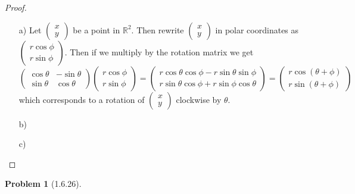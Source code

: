 \documentclass[10pt]{article}
\newcommand{\sk}{\vskip 10mm}
\newcommand{\bb}[1]{\mathbb{#1}}
\newcommand{\vc}[2]{\left(\begin{array}{cc} #1\\ #2\end{array}\right)}
\theoremstyle{plain}
\newtheorem{problem}{Problem}
\theoremstyle{remark}
\begin{document}
\begin{proof}
  \begin{itemize}
  \item[a)] Let $\vc{x}{y}$ be a point in $\bb{R}^2$. Then rewrite $\vc{x}{y}$ in
    polar coordinates as $\vc{r\cos\phi}{r\sin\phi}$. Then if we multiply by the
    rotation matrix we get
    \[
      \left(\begin{array}{cc}
        \cos\theta&-\sin\theta\\
        \sin\theta&\cos\theta
      \end{array}\right)
      \vc{r\cos\phi}{r\sin\phi}
      = \vc{r\cos\theta\cos\phi-r\sin\theta\sin\phi}{r\sin\theta\cos\phi+r\sin\phi\cos\theta}
      = \vc{r\cos(\theta+\phi)}{r\sin(\theta+\phi)}
    \]
    which corresponds to a rotation of $\vc{x}{y}$ clockwise by $\theta$.
  \item[b)] 
  \item[c)]
  \end{itemize}
\end{proof}

\sk

\begin{problem}[1.6.26]
  
\end{problem}
\end{document}

